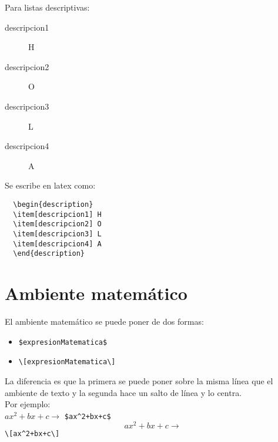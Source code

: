 \documentclass[spanish,12pt,letterpaper]{article}
\theoremstyle{break}
\begin{document}
Para listas descriptivas:
\begin{description}
\item[descripcion1] H
\item[descripcion2] O
\item[descripcion3] L
\item[descripcion4] A
\end{description}
Se escribe en latex como:
\begin{verbatim}
  \begin{description}
  \item[descripcion1] H
  \item[descripcion2] O
  \item[descripcion3] L
  \item[descripcion4] A
  \end{description}
\end{verbatim}

\section{Ambiente matemático}
El ambiente matemático se puede poner de dos formas:
\begin{itemize}
\item \verb!$expresionMatematica$!
\item \verb!\[expresionMatematica\]!
\end{itemize}
La diferencia es que la primera se puede poner sobre la misma línea que el ambiente de texto y
la segunda hace un salto de línea y lo centra.\\
Por ejemplo:\\
$ax^2+bx+c \to$ \verb!$ax^2+bx+c$!
\[ax^2+bx+c \to\] \verb!\[ax^2+bx+c\]!
\end{document}
